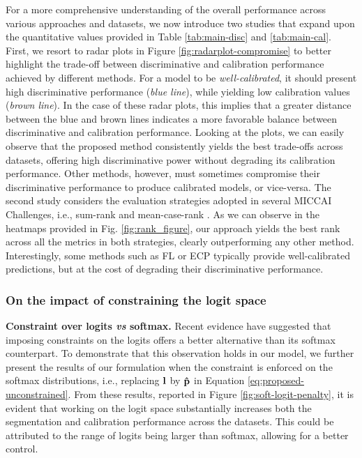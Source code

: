 \documentclass[twocolumn,final,10pt]{elsarticle}
\newcommand{\rev}[1]{{\color{black}#1}}
\begin{document}
\rev{For a more comprehensive understanding of the overall performance across various approaches and datasets, we now introduce two studies that expand upon the quantitative values provided in Table \ref{tab:main-disc} and \ref{tab:main-cal}. First, we resort to radar plots in Figure \ref{fig:radarplot-compromise} to better highlight the trade-off between discriminative and calibration performance achieved by different methods. For a model to be \textit{well-calibrated}, it should present high discriminative performance (\textit{blue line}), while yielding low calibration values (\textit{brown line}). In the case of these radar plots, this implies that a greater distance between the blue and brown lines indicates a more favorable balance between discriminative and calibration performance. Looking at the plots, we can easily observe that the proposed method consistently yields the best trade-offs across datasets, offering high discriminative power without degrading its calibration performance. Other methods, however, must sometimes compromise their discriminative performance to produce calibrated models, or vice-versa. The second study considers the evaluation strategies adopted in several MICCAI Challenges, i.e., sum-rank \citep{mendrik2015mrbrains} and mean-case-rank \citep{MAIER2017250}. As we can observe in the heatmaps provided in Fig. \ref{fig:rank_figure}, our approach yields the best rank across all the metrics in both strategies, clearly outperforming any other method.} Interestingly, some methods such as FL or ECP typically provide well-calibrated predictions, but at the cost of degrading their discriminative performance. 



\subsubsection{\rev{On the impact of constraining the logit space}} %

\noindent \textbf{Constraint over logits \textit{vs} softmax.}
Recent evidence \citep{liu2022devil, murugesan2022calibrating} have suggested that imposing constraints on the logits offers a better alternative than its softmax counterpart. To demonstrate that this observation holds in our model, we further present the results of our formulation when the constraint is enforced on the softmax distributions, i.e., replacing $\bf{l}$ by \rev{$\bf{\hat{p}}$ in Equation \ref{eq:proposed-unconstrained}. From these results, reported in Figure \ref{fig:soft-logit-penalty}, it is evident that working on the logit space substantially increases both the segmentation and calibration performance across the datasets. This could be attributed to the range of logits being larger than softmax, allowing for a better control.}
\end{document}
